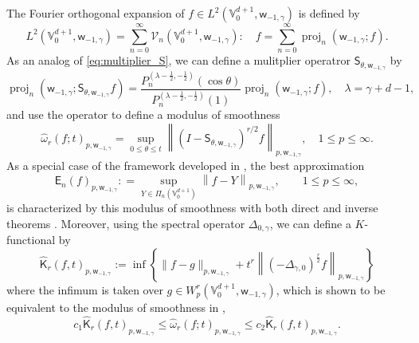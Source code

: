 \documentclass{amsart}
\theoremstyle{remark}
\def\g{{\gamma}}
\def\t{{\theta}}
\def\l{{\lambda}}
\def\o{{\omega}}
\def\CV{{\mathcal V}}
\def\VV{{\mathbb V}}
\def\proj{\operatorname{proj}}
\def\sE{{\mathsf E}}
\def\sK{{\mathsf K}}
\def\sS{{\mathsf S}}
\def\sw{{\mathsf w}}
\def\g{{\gamma}}
\def\t{{\theta}}
\def\l{{\lambda}}
\def\o{{\omega}}
\def\CV{{\mathcal V}}
\def\VV{{\mathbb V}}
\def\proj{\operatorname{proj}}
\begin{document}
The Fourier orthogonal expansion of $f \in L^2(\VV_0^{d+1}, \sw_{-1,\g})$ is defined by 
$$
  L^2\left(\VV_0^{d+1}, \sw_{-1,\g}\right) = \sum_{n=0}^\infty  \CV_n(\VV_0^{d+1}, \sw_{-1,\g}): 
     \quad  f = \sum_{n=0}^\infty \proj_n(\sw_{-1,\g};f). 
$$
As an analog of \eqref{eq:multiplier_S}, we can define a mulitplier operatror $\sS_{\t, \sw_{-1,\g}}$ by
$$
\proj_n(\sw_{-1,\g}; \sS_{\t,\sw_{-1,\g}}f) = \frac{P_n^{(\l - \frac{1}{2}, -\frac{1}{2})} (\cos \t)}{P_n^{(\l - \frac{1}{2}, -\frac{1}{2})} (1)} \proj_n(\sw_{-1,\g}; f), \quad \l = \g+d-1, 
$$
and use the operator to define a modulus of smoothness  
\begin{equation} \label{eq:o_rHat}
 \widehat{\o}_r(f; t)_{p,\sw_{-1,\g}} = \sup_{0 \le \t \le t} \left\| \left(I - \sS_{\t,\sw_{-1,\g}}\right)^{r/2} f\right\|_{p,\sw_{-1,\g}}, 
   \quad 1 \le p \le \infty. 
\end{equation}
As a special case of the framework developed in \cite{X21}, the best approximation 
$$
   \sE_n(f)_{p, \sw_{-1,\g}} : = \sup_{Y \in \Pi_n(\VV_0^{d+1})} \left\| f- Y \right \|_{p, \sw_{-1,\g}}, \qquad 1 \le p \le \infty,
$$
is characterized by this modulus of smoothness with both direct and inverse theorems \cite[Theorem 3.12]{X21}.
Moreover, using the spectral operator $\Delta_{0,\g}$, we can define a $K$-functional by
\begin{equation}\label{eq:K_rHat}
 \widehat{\sK}_r(f, t)_{p,\sw_{-1,\g}} := \inf \left\{ \|f - g\|_{p,\sw_{-1,\g}} + 
      t^r \left\|(-\Delta_{\g,0})^{\frac{r}{2}} f \right\|_{p,\sw_{-1,\g}} \right\}
\end{equation}
where the infimum is taken over $g \in W_p^r(\VV_0^{d+1}, \sw_{-1,\g})$, which is shown to be equivalent to the 
modulus of smoothness in \cite[Theorem 3.13]{X21}, 
$$
   c_1  \widehat{\sK}_r(f, t)_{p,\sw_{-1,\g}} \le \widehat{\o}_r(f; t)_{p,\sw_{-1,\g}} \le c_2   \widehat{\sK}_r(f, t)_{p,\sw_{-1,\g}}.
$$
\end{document}
